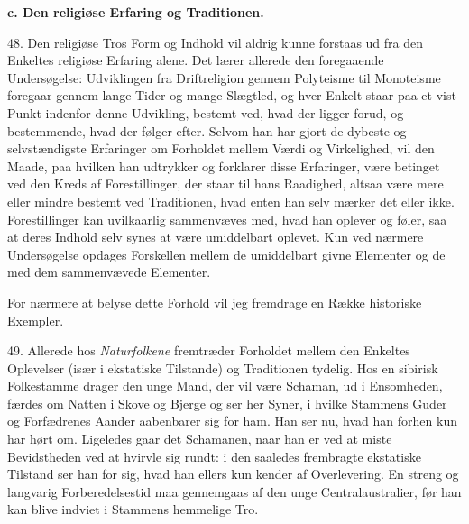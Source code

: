 \documentclass[12pt,a4paper,openany]{book}
\newcommand{\opage}[1]{\marginnote{\footnotesize\textit{[#1]}}}
\begin{document}
\begin{center}\textbf{c. Den religiøse Erfaring og Traditionen.}\end{center}

48. Den religiøse Tros Form og Indhold vil aldrig kunne forstaas ud fra
den Enkeltes religiøse Erfaring alene. Det lærer allerede den
foregaaende Undersøgelse: Udviklingen fra Driftreligion gennem
Polyteisme til Monoteisme foregaar gennem lange Tider og mange Slægtled,
og hver Enkelt staar paa et vist Punkt indenfor denne Udvikling, bestemt
ved, hvad der ligger forud, og bestemmende, hvad der følger efter.
Selvom han har gjort de dybeste og selvstændigste Erfaringer om
Forholdet mellem Værdi og Virkelighed, vil den Maade, paa hvilken han
udtrykker og forklarer disse Erfaringer, være betinget ved den Kreds af
Forestillinger, der staar til hans Raadighed, altsaa være mere eller
mindre bestemt ved Traditionen, hvad enten han selv mærker det eller
ikke. Forestillinger kan uvilkaarlig sammenvæves med, hvad han oplever
og føler, saa at deres Indhold selv synes at være umiddelbart oplevet.
Kun ved nærmere Undersøgelse opdages Forskellen mellem de umiddelbart
givne Elementer og de med dem sammenvævede Elementer.

For nærmere at belyse dette Forhold vil jeg fremdrage en Række
historiske Exempler.

49. Allerede hos \textit{Naturfolkene} fremtræder Forholdet mellem den
Enkeltes Oplevelser (især i ekstatiske Tilstande) og Traditionen
tydelig. Hos en sibirisk Folkestamme drager den unge Mand, der vil være
Schaman, ud i Ensomheden, færdes om Natten i Skove og Bjerge og ser her
Syner, i hvilke Stammens Guder og Forfædrenes Aander aabenbarer sig for
ham. Han ser nu, hvad han forhen kun har hørt om. Ligeledes gaar det
Schamanen,
\opage{110}naar han er ved at miste Bevidstheden ved at hvirvle sig
rundt: i den saaledes frembragte ekstatiske Tilstand ser han for sig,
hvad han ellers kun kender af Overlevering. En streng og langvarig
Forberedelsestid maa gennemgaas af den unge Centralaustralier, før han
kan blive indviet i Stammens hemmelige Tro.
\end{document}

